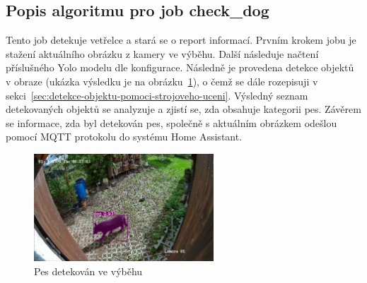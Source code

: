 \subsection*{Popis algoritmu pro job check\_dog}
Tento job detekuje vetřelce a stará se o report informací.
Prvním krokem jobu je stažení aktuálního obrázku z kamery ve výběhu.
Další následuje načtení příslušného Yolo modelu dle konfigurace.
Následně je provedena detekce objektů v obraze (ukázka výsledku je na obrázku~\ref{fig:dog_detected}), o čemž se dále rozepisuji v sekci~\ref{sec:detekce-objektu-pomoci-strojoveho-uceni}.
Výsledný seznam detekovaných objektů se analyzuje a zjistí se, zda obsahuje kategorii pes.
Závěrem se informace, zda byl detekován pes, společně s aktuálním obrázkem odešlou pomocí MQTT protokolu do systému Home Assistant.

\begin{figure}[H]
    \centering
    \includegraphics[width=0.6\textwidth]{img/dog_detected}
    \caption{Pes detekován ve výběhu}
    \label{fig:dog_detected}
\end{figure}



%
